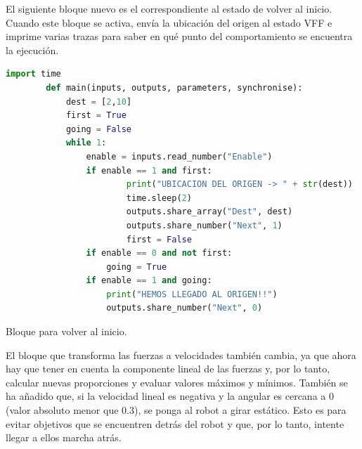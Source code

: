 El siguiente bloque nuevo es el correspondiente al estado de volver al inicio. Cuando este bloque se activa, envía la ubicación del origen al estado VFF e imprime
varias trazas para saber en qué punto del comportamiento se encuentra la ejecución.

\begin{code}[H]
    \begin{lstlisting}[language=python]
        import time
        def main(inputs, outputs, parameters, synchronise):
            dest = [2,10]
            first = True
            going = False
            while 1:
                enable = inputs.read_number("Enable")
                if enable == 1 and first:
                        print("UBICACION DEL ORIGEN -> " + str(dest))
                        time.sleep(2)
                        outputs.share_array("Dest", dest)
                        outputs.share_number("Next", 1)
                        first = False
                if enable == 0 and not first:
                    going = True
                if enable == 1 and going:
                    print("HEMOS LLEGADO AL ORIGEN!!")
                    outputs.share_number("Next", 0)
    \end{lstlisting}
    \caption[Bloque return home]{Bloque para volver al inicio.}
    \label{cod:FSM_return_home}
\end{code}

El bloque que transforma las fuerzas a velocidades también cambia, ya que ahora hay que tener en cuenta la componente lineal de las fuerzas y, por lo tanto, calcular nuevas
proporciones y evaluar valores máximos y mínimos. También se ha añadido que, si la velocidad lineal es negativa y la angular es cercana a 0 (valor absoluto menor que 0.3), se
ponga al robot a girar estático. Esto es para evitar objetivos que se encuentren detrás del robot y que, por lo tanto, intente llegar a ellos marcha atrás.

